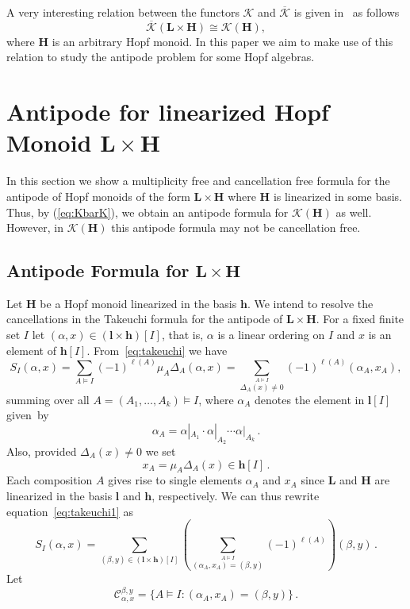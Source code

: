 \documentclass[ALCO,ThmDefs,Unicode,epreuves]{cedram}
\newcommand{\bL}{\mathbf{L}}
\newcommand{\bH}{\mathbf{H}}
\newcommand{\bh}{\mathbf{h}}
\newcommand{\Kc}{\mathcal{K}}
\newcommand{\Kcb}{\overline{\Kc}}
\begin{document}
A very interesting relation between the functors $\Kc$ and $\Kcb$ is given in~\cite[Theorem~15.13]{AM:2010} as follows
\begin{equation}\label{eq:KbarK}
 \Kcb(\bL\times\bH) \cong \Kc(\bH),
\end{equation}
where $\bH$ is an arbitrary Hopf monoid. In this paper we aim to make use of this relation to study the antipode problem for some Hopf algebras.


\section{Antipode for linearized Hopf Monoid \texorpdfstring{$\bL\times \bH$}{L times H}}\label{s:antiLxH}

In this section we show a multiplicity free and cancellation free formula for the antipode of Hopf monoids of the form $\bL\times \bH$ where $\bH$ is linearized in some basis. Thus, by (\ref{eq:KbarK}), we obtain an antipode formula for $\Kc(\bH)$ as well. However, in $\Kc(\bH)$ this antipode formula may not be cancellation free. 

\subsection{Antipode Formula for \texorpdfstring{$\bL\times \bH$}{L times H}}\label{ss:UsingTakeushi}

Let $\bH$ be a Hopf monoid linearized in the basis $\bh$. We intend to resolve the cancellations in the Takeuchi formula for the antipode of $\bL\times\bH$. For a fixed finite set $I$ let $(\alpha,x)\in (\mathbf{l}\times\bh)[I]$, that is, $\alpha$ is a linear ordering on $I$ and $x$ is an element of $\bh [I]$. From~\eqref{eq:takeuchi} we have
\begin{equation}\label{eq:takeuchi1}
 S_I(\alpha,x) = \sum_{A\models I} (-1)^{\ell(A)} \mu_A \Delta_A(\alpha,x)
 = \sum_{\stackrel{A\models I} %
 {\Delta_A(x)\ne 0}} (-1)^{\ell(A)} (\alpha_A,x_A),
\end{equation}
 summing over all $A=(A_1,\ldots,A_k)\models I$, where $\alpha_A$ denotes the element in $\mathbf{l} [I]$ given~by
 $$\alpha_A= \alpha|_{A_1}\cdot \alpha|_{A_2}\cdots \alpha|_{A_k}\,.
$$ Also, provided $\Delta_A(x)\neq 0$ we set
 $$x_A=\mu_A\Delta_A(x) \in \bh[I]\,.$$
Each composition $A$ gives rise to single elements $\alpha_A$ and $x_A$ since $\bL$ and $\bH$ are linearized in the basis $\mathbf{l}$ and $\bh$, respectively. 
We can thus rewrite equation~\eqref{eq:takeuchi1} as
\begin{equation}\label{eq:takeuchi2}
 S_I(\alpha,x) = \sum_{(\beta,y)\in (\mathbf{l}\times\bh)[I]}\left(\sum_{\stackrel{A\models I}
 {(\alpha_A,x_A)=(\beta,y)}} (-1)^{\ell(A)}\right) (\beta,y)\,.
\end{equation}
Let 
\begin{equation}\label{eq:alphabetaxy}
 \mathcal{C}_{\alpha,x}^{\beta,y}=\big\{A\models I : (\alpha_A,x_A)=(\beta,y)\big\}\,.
 \end{equation}
\end{document}
